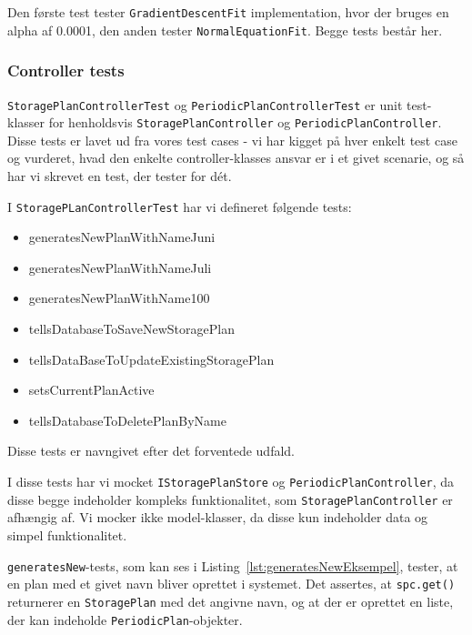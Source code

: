Den første test tester \texttt{GradientDescentFit}\cite{GradientDescent} implementation, hvor der bruges en alpha af 0.0001, den anden tester \texttt{NormalEquationFit}\cite{NormalEquation}. Begge tests består her. 

\subsubsection{Controller tests}
\texttt{StoragePlanControllerTest} og \texttt{PeriodicPlanControllerTest} er unit test-klasser for henholdsvis \texttt{StoragePlanController} og \texttt{PeriodicPlanController}. Disse tests er lavet ud fra vores test cases - vi har kigget på hver enkelt test case og vurderet, hvad den enkelte controller-klasses ansvar er i et givet scenarie, og så har vi skrevet en test, der tester for dét. 

I \texttt{StoragePLanControllerTest} har vi defineret følgende tests:
\begin{itemize}
    \item generatesNewPlanWithNameJuni
    \item generatesNewPlanWithNameJuli
    \item generatesNewPlanWithName100
    \item tellsDatabaseToSaveNewStoragePlan
    \item tellsDataBaseToUpdateExistingStoragePlan
    \item setsCurrentPlanActive
    \item tellsDatabaseToDeletePlanByName
\end{itemize}
Disse tests er navngivet efter det forventede udfald.

I disse tests har vi mocket \texttt{IStoragePlanStore} og \texttt{PeriodicPlanController}, da disse begge indeholder kompleks funktionalitet, som \texttt{StoragePlanController} er afhængig af. Vi mocker ikke model-klasser, da disse kun indeholder data og simpel funktionalitet.

\texttt{generatesNew}-tests, som kan ses i Listing~\ref{lst:generatesNewEksempel}, tester, at en plan med et givet navn bliver oprettet i systemet. Det assertes, at \texttt{spc.get()} returnerer en \texttt{StoragePlan} med det angivne navn, og at der er oprettet en liste, der kan indeholde \texttt{PeriodicPlan}-objekter. 

